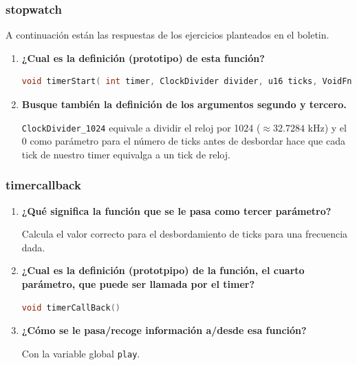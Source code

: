 \subsubsection{stopwatch}

A continuación están las respuestas de los ejercicios planteados en el boletin.

\begin{enumerate}
	\item \textbf{¿Cual es la definición (prototipo) de esta función?}
		\begin{lstlisting}[basicstyle=\ttfamily\scriptsize,language=C,frame=single]
void timerStart( int timer, ClockDivider divider, u16 ticks, VoidFn callback )
		\end{lstlisting}

	\item \textbf{Busque también la definición de los argumentos segundo y tercero.}

	{\tt ClockDivider\_1024} equivale a dividir el reloj por 1024 ($\approx 32.7284$ kHz) y el 0 como parámetro para el número de ticks antes de desbordar hace que cada tick de nuestro timer equivalga a un tick de reloj.

\end{enumerate}

\subsubsection{timercallback}

\begin{enumerate}
	\item \textbf{¿Qué significa la función que se le pasa como tercer parámetro?}

	Calcula el valor correcto para el desbordamiento de ticks para una frecuencia dada.

	\item \textbf{¿Cual es la definición (prototpipo) de la función, el cuarto parámetro, que puede ser llamada por el timer?}

	\begin{lstlisting}[basicstyle=\ttfamily\scriptsize,language=C,frame=single]
void timerCallBack()
	\end{lstlisting}
	
	\item \textbf{¿Cómo se le pasa/recoge información a/desde esa función?}

	Con la variable global {\tt play}.
		
\end{enumerate}

